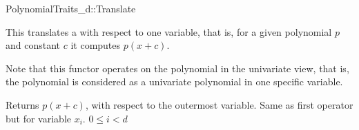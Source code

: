 \begin{ccRefConcept}{PolynomialTraits_d::Translate}
\ccDefinition

This  translates a 
 with respect to one variable, that is, 
for a given polynomial $p$ and constant $c$ it computes $p(x+c)$. 

Note that this functor operates on the polynomial in the univariate view, that is, 
the polynomial is considered as a univariate polynomial in one specific variable. 

\ccRefines 
{}

\ccTypes

\ccGlue
{}
\ccGlue
{}

\ccOperations
{}
         { Returns $p(x+c)$, with respect to the outermost variable. }
         { Same as first operator but for variable $x_i$. 
           \ccPrecond $0 \leq i  < d$
         }


\ccSeeAlso

\\
\\

\end{ccRefConcept}

